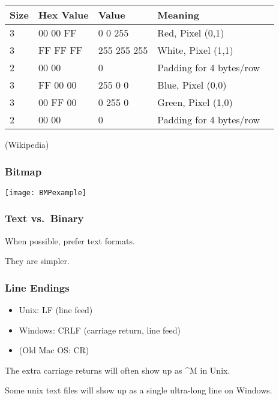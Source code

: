 \begin{frame}[fragile]
\begin{center}
\begin{tabular}{lllll}
\toprule
Size & Hex Value & Value & Meaning\\
\midrule
3 & 00 00 FF & 0 0 255 & Red, Pixel (0,1)\\
3 & FF FF FF & 255 255 255 &  White, Pixel (1,1)\\
2 & 00 00    & 0 & Padding for 4 bytes/row\\
3 & FF 00 00 & 255 0 0 & Blue, Pixel (0,0)\\
3 & 00 FF 00 & 0 255 0 & Green, Pixel (1,0)\\
2 & 00 00    & 0  & Padding for 4 bytes/row\\
\bottomrule
\end{tabular}
\end{center}


\begin{flushright}
(Wikipedia)
\end{flushright}

\end{frame}

\begin{frame}[fragile]
\frametitle{Bitmap}

\centering
\texttt{[image: BMPexample]}

\end{frame}

\begin{frame}[fragile]
\frametitle{Text vs.\ Binary}
When possible, prefer text formats.

They are simpler.
\end{frame}

\begin{frame}[fragile]
\frametitle{Line Endings}
\begin{itemize}
\item Unix: LF (line feed)
\item Windows: CRLF (carriage return, line feed)
\item (Old Mac OS: CR)
\end{itemize}

The extra carriage returns will often show up as \^{}M in Unix.

Some unix text files will show up as a single ultra-long line on Windows.

\end{frame}


